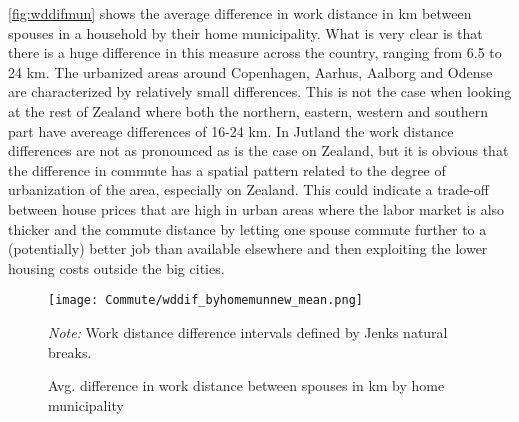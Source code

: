 \autoref{fig:wddifmun} shows the average difference in work distance in km between spouses in a household by their home municipality. What is very clear is that there is a huge difference in this measure across the country, ranging from 6.5 to 24 km. The urbanized areas around Copenhagen, Aarhus, Aalborg and Odense are characterized by relatively small differences. This is not the case when looking at the rest of Zealand where both the northern, eastern, western and southern part have avereage differences of 16-24 km. In Jutland the work distance differences are not as pronounced as is the case on Zealand, but it is obvious that the difference in commute has a spatial pattern related to the degree of urbanization of the area, especially on Zealand. This could indicate a trade-off between house prices that are high in urban areas where the labor market is also thicker and the commute distance by letting one spouse commute further to a (potentially) better job than available elsewhere and then exploiting the lower housing costs outside the big cities.
\begin{figure}[!htb]
\centering
\begin{minipage}{0.8\textwidth}
\texttt{[image: Commute/wddif\_byhomemunnew\_mean.png]} 
{\tiny \emph{Note:} Work distance difference intervals defined by Jenks natural breaks. \par}
\end{minipage}
\caption{Avg. difference in work distance between spouses in km by home municipality}
\label{fig:wddifmun}
\end{figure}

